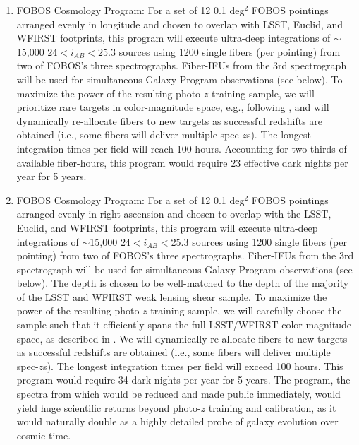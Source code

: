 \documentclass[oneside,11pt]{amsart}
\newcounter{chalno}
\newcommand{\chal}[1]{\refstepcounter{chalno}\label{#1}}
\begin{document}
\chal{photozs}
%
\begin{enumerate}[rightmargin=0.2cm,leftmargin=0.2cm]
%
\item[] {\textsf {\large FOBOS Cosmology Program:}}  For a set of 12 0.1 deg$^2$ FOBOS pointings arranged evenly in longitude and chosen to overlap with LSST, Euclid, and WFIRST footprints, this program will execute ultra-deep integrations of $\sim$15,000 $24 < i_{AB} < 25.3$ sources using 1200 single fibers (per pointing) from two of FOBOS's three spectrographs.  Fiber-IFUs from the 3rd spectrograph will be used for simultaneous Galaxy Program observations (see below).  To maximize the power of the resulting photo-$z$ training sample, we will prioritize rare targets in color-magnitude space, e.g., following \citet{masters19}, and will dynamically re-allocate fibers to new targets as successful redshifts are obtained (i.e., some fibers will deliver multiple spec-$z$s).  The longest integration times per field will reach 100 hours.  Accounting for two-thirds of available fiber-hours, this program would require 23 effective dark nights per year for 5 years. %

\item[] {\textsf {\large FOBOS Cosmology Program:}}  For a set of 12
  0.1 deg$^2$ FOBOS pointings arranged evenly in right ascension and
  chosen to overlap with the LSST, Euclid, and WFIRST footprints, this
  program will execute ultra-deep integrations of $\sim$15,000 $24 <
  i_{AB} < 25.3$ sources using 1200 single fibers (per pointing) from
  two of FOBOS's three spectrographs. 
  Fiber-IFUs from the 3rd
  spectrograph will be used for simultaneous Galaxy Program
  observations (see below).  The depth is chosen to be well-matched to the depth of the majority of the LSST and WFIRST
  weak lensing shear sample. To maximize the power of the resulting
  photo-$z$ training sample, we will carefully choose the sample such that it 
  efficiently spans the full LSST/WFIRST color-magnitude space, as described in \citet{masters15, masters19}. We will
  dynamically re-allocate fibers to new targets as successful
  redshifts are obtained (i.e., some fibers will deliver multiple
  spec-$z$s).  The longest integration times per field will exceed 100
  hours.  This program would require 34 dark nights per year for 5
  years. The program, the spectra from which would be reduced and made public immediately, would yield huge scientific returns beyond photo-$z$ training and calibration, as it would naturally double as 
  a highly detailed probe of galaxy evolution over cosmic time. 

\end{enumerate}
\end{document}
